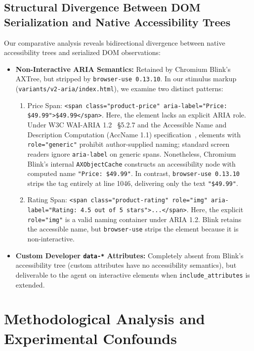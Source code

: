 \documentclass[11pt,a4paper]{article}
\begin{document}
\subsection{Structural Divergence Between DOM Serialization and Native Accessibility Trees}
Our comparative analysis reveals bidirectional divergence between native accessibility trees and serialized DOM observations:
\begin{itemize}
    \item \textbf{Non-Interactive ARIA Semantics:} Retained by Chromium Blink's AXTree, but stripped by \texttt{browser-use 0.13.10}. In our stimulus markup (\texttt{variants/v2-aria/index.html}), we examine two distinct patterns:
    \begin{enumerate}
        \item Price Span: \texttt{<span class="product-price" aria-label="Price: \$49.99">\$49.99</span>}. Here, the element lacks an explicit ARIA role. Under W3C WAI-ARIA 1.2~\cite{wai_aria12} \S5.2.7 and the Accessible Name and Description Computation (AccName 1.1) specification~\cite{accname11}, elements with \texttt{role="generic"} prohibit author-supplied naming; standard screen readers ignore \texttt{aria-label} on generic spans. Nonetheless, Chromium Blink's internal \texttt{AXObjectCache} constructs an accessibility node with computed name \texttt{"Price: \$49.99"}. In contrast, \texttt{browser-use 0.13.10} strips the tag entirely at line 1046, delivering only the text \texttt{"\$49.99"}.
        \item Rating Span: \texttt{<span class="product-rating" role="img" aria-label="Rating: 4.5 out of 5 stars">...</span>}. Here, the explicit \texttt{role="img"} is a valid naming container under ARIA 1.2. Blink retains the accessible name, but \texttt{browser-use} strips the element because it is non-interactive.
    \end{enumerate}
    \item \textbf{Custom Developer \texttt{data-*} Attributes:} Completely absent from Blink's accessibility tree (custom attributes have no accessibility semantics), but deliverable to the agent on interactive elements when \texttt{include\_attributes} is extended.
\end{itemize}

\section{Methodological Analysis and Experimental Confounds}
\label{sec:methodology}
\end{document}
